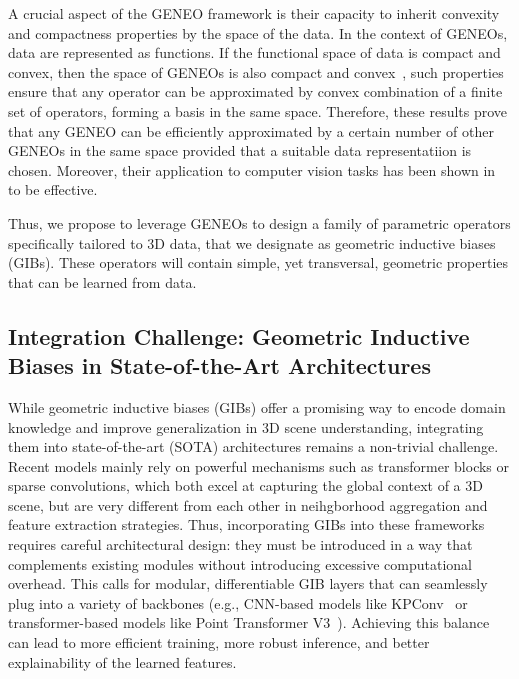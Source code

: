 %

A crucial aspect of the GENEO framework is their capacity to inherit
convexity and compactness properties by the space of the data.
In the context of GENEOs, data are represented as functions.
If the functional space of data is compact and convex, then the space of GENEOs
is also compact and convex~\cite{bergomi2019towards}, such properties ensure 
that any operator can be approximated by convex combination of a finite
set of operators, forming a basis in the same space.
%
Therefore, these results prove that any GENEO can be efficiently approximated
by a certain number of other GENEOs in the same space provided that a
suitable data representatiion is chosen.
%
Moreover, their application to computer vision tasks has been shown
in~\cite{bergomi2019towards,bocchi2022geneonet} to be effective.

Thus, we propose to leverage GENEOs to design a family of parametric operators
specifically tailored to 3D data, that we designate as geometric inductive
biases (GIBs). These operators will contain simple, yet transversal, geometric
properties that can be learned from data.
%

\subsection{Integration Challenge: Geometric Inductive Biases in State-of-the-Art Architectures}
%
While geometric inductive biases (GIBs) offer a promising way to encode domain
knowledge and improve generalization in 3D scene understanding, integrating
them into state-of-the-art (SOTA) architectures remains a non-trivial
challenge.
%
Recent models mainly rely on powerful mechanisms such as transformer blocks or
sparse convolutions, which both excel at capturing the global context of a 3D
scene, but are very different from each other in neihgborhood aggregation and
feature extraction strategies.
%
Thus, incorporating GIBs into these frameworks requires careful architectural
design: they must be introduced in a way that complements existing modules
without introducing excessive computational overhead. This calls for modular,
differentiable GIB layers that can seamlessly plug into a variety of backbones
(e.g., CNN-based models like KPConv~\cite{thomas2019kpconv} or
transformer-based models like Point Transformer V3~\cite{wu2023ptv3}).
%
Achieving this balance can lead to more efficient training, more robust
inference, and better explainability of the learned features.

